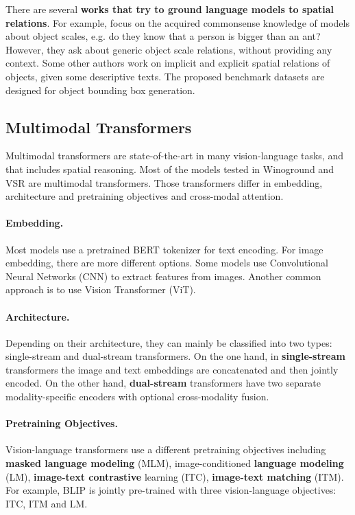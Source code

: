 There are several \textbf{works that try to ground language models to spatial relations}. For example, \cite{bagherinezhad2016elephants, elazar2019large} focus on the acquired commonsense knowledge of models about object scales, e.g. do they know that a person is bigger than an ant? However, they ask about generic object scale relations, without providing any context. Some other authors \cite{collell2018acquiring, elu2021inferring} work on implicit and explicit spatial relations of objects, given some descriptive texts. The proposed benchmark datasets are designed for object bounding box generation.

\subsection{Multimodal Transformers} \label{sec:multimodal_transformers}

Multimodal transformers are state-of-the-art in many vision-language tasks, and that includes spatial reasoning. Most of the models tested in Winoground \cite{thrush2022winoground} and VSR \cite{liu2022visual} are multimodal transformers. Those transformers differ in embedding, architecture and pretraining objectives and cross-modal attention.

\paragraph{Embedding.} Most models use a pretrained BERT tokenizer for text encoding. For image embedding, there are more different options. Some models use Convolutional Neural Networks (CNN) to extract features from images. Another common approach is to use Vision Transformer (ViT).

\paragraph{Architecture.} Depending on their architecture, they can mainly be classified into two types: single-stream and dual-stream transformers. On the one hand, in \textbf{single-stream} transformers the image and text embeddings are concatenated and then jointly encoded. On the other hand, \textbf{dual-stream} transformers have two separate modality-specific encoders with optional cross-modality fusion.

\paragraph{Pretraining Objectives.} Vision-language transformers use a different pretraining objectives including \textbf{masked language modeling} (MLM), image-conditioned \textbf{language modeling} (LM), \textbf{image-text contrastive} learning (ITC), \textbf{image-text matching} (ITM). For example, BLIP \cite{li2022blip} is jointly pre-trained with three vision-language objectives: ITC, ITM and LM.

